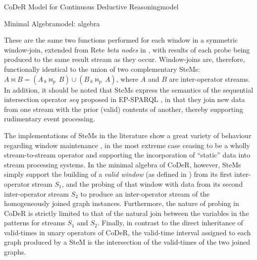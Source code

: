 \begin{nestedsection}{CoDeR Model for Continuous Deductive Reasoning}{model}
\begin{nestedsection}{Minimal Algebra}{model: algebra}
\begin{description}
				These are the same two functions performed for each window in a symmetric window-join, extended from Rete \emph{beta nodes} in \citep{ReteDBMS}, with results of each probe being produced to the same result stream as they occur.
				Window-joins are, therefore, functionally identical to the union of two complementary SteMs:
				${A \Join B = \left( A\,{}_b{\Join_p}\,B \right) \cup \left( B\,{}_b{\Join_p}\,A \right)}$, where $A$ and $B$ are inter-operator streams.
				In addition, it should be noted that SteMs express the semantics of the sequential intersection operator ${seq}$ proposed in EP-SPARQL \citep{EP-SPARQL}, in that they join new data from one stream with the prior (valid) contents of another, thereby supporting rudimentary event processing.

				The implementations of SteMs in the literature show a great variety of behaviour regarding window maintenance \citep{SteMs}, in the most extreme case ceasing to be a wholly stream-to-stream operator and supporting the incorporation of ``static'' data into stream processing systems.
				In the minimal algebra of CoDeR, however, SteMs simply support the building of a \emph{valid window} (as defined in ) from its first inter-operator stream $S_1$, and the probing of that window with data from its second inter-operator stream $S_2$ to produce an inter-operator stream of the homogeneously joined graph instances.
				Furthermore, the nature of probing in CoDeR is strictly limited to that of the natural join between the variables in the patterns for streams $S_1$ and $S_2$.
				Finally, in contrast to the direct inheritance of valid-times in unary operators of CoDeR, the valid-time interval assigned to each graph produced by a SteM is the intersection of the valid-times of the two joined graphs.
		\end{description}


\end{nestedsection}
\end{nestedsection}
